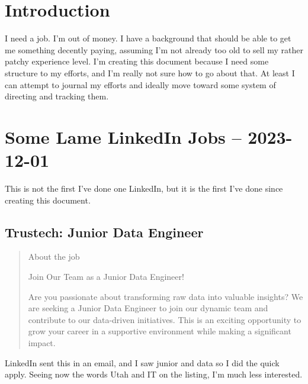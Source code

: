 \documentclass[
	letterpaper, %
	12pt, %
]{CSSullivanBusinessReport}
\begin{document}
\newpage


\section{Introduction} %

I need a job. I'm out of money. I have a background that should be able to get me something decently paying, assuming I'm not already too old to sell my rather patchy experience level. I'm creating this document because I need some structure to my efforts, and I'm really not sure how to go about that. At least I can attempt to journal my efforts and ideally move toward some system of directing and tracking them. 


\section[1 Dec: LinkedIn]{Some Lame LinkedIn Jobs -- 2023-12-01} %

This is not the first I've done one LinkedIn, but it is the first I've done since creating this document. 

\subsection[Trustech]{Trustech: Junior Data Engineer}

\begin{quote}
About the job

Join Our Team as a Junior Data Engineer!

Are you passionate about transforming raw data into valuable insights? We are seeking a Junior Data Engineer to join our dynamic team and contribute to our data-driven initiatives. This is an exciting opportunity to grow your career in a supportive environment while making a significant impact.
\end{quote}

LinkedIn sent this in an email, and I saw junior and data so I did the quick apply. Seeing now the words Utah and IT on the listing, I'm much less interested. 

\end{document}
